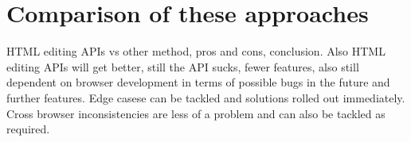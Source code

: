 
\section{Comparison of these approaches}

HTML editing APIs vs other method, pros and cons, conclusion. Also HTML editing APIs will get better, still the API sucks, fewer features, also still dependent on browser development in terms of possible bugs in the future and further features. Edge casese can be tackled and solutions rolled out immediately. Cross browser inconsistencies are less of a problem and can also be tackled as required.